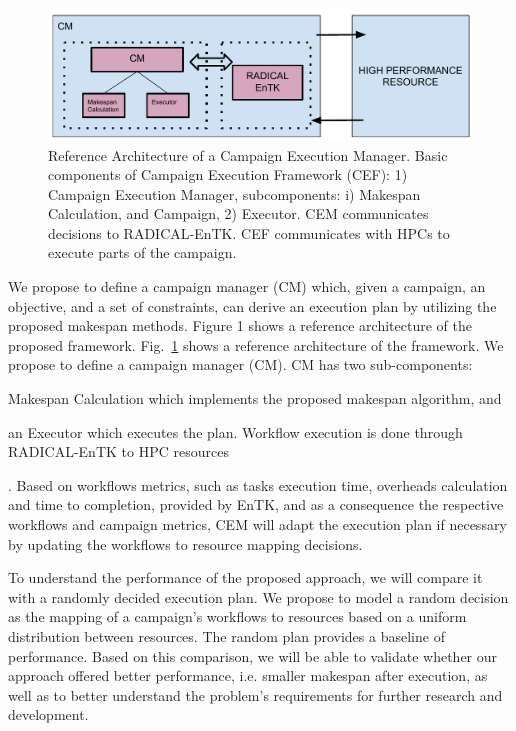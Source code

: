 \begin{figure}[t]
	\centering
	\includegraphics[width=.85\textwidth]{Proposal/extended_abstract/CEM_RefArch.pdf}
	\caption{Reference Architecture of a Campaign Execution Manager. Basic components of Campaign Execution Framework (CEF): 1) Campaign Execution Manager, subcomponents: i) Makespan Calculation, and Campaign, 2) Executor. CEM communicates decisions to RADICAL-EnTK. CEF communicates with HPCs to execute parts of the campaign.}\label{refarch}
\end{figure}

We propose to define a campaign manager (CM) which, given a campaign, an objective, and a set of constraints, can derive an execution plan by utilizing the proposed makespan methods. Figure 1 shows a reference architecture of the proposed framework. Fig.~\ref{refarch} shows a reference architecture of the framework. We propose to define a campaign manager (CM). CM has two sub-components: 
\begin{inparaenum}[(1)]
\item Makespan Calculation which implements the proposed makespan algorithm, and 
\item an Executor which executes the plan. Workflow execution is done through RADICAL-EnTK to HPC resources
\end{inparaenum}.
Based on workflows metrics, such as tasks execution time, overheads calculation and time to completion, provided by EnTK,  and as a consequence the respective workflows and campaign metrics, CEM will adapt the execution plan if necessary by updating the workflows to resource mapping decisions.

To understand the performance of the proposed approach, we will compare it with a randomly decided execution plan. We propose to model a random decision as the mapping of a campaign’s workflows to resources based on a uniform distribution between resources. The random plan provides a baseline of performance. Based on this comparison, we will be able to validate whether our approach offered better performance, i.e. smaller makespan after execution, as well as to better understand the problem’s requirements for further research and development.

